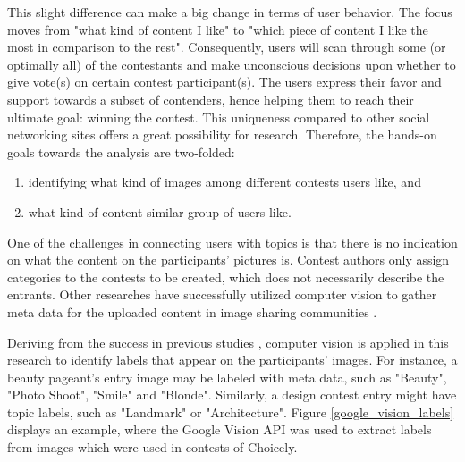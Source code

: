     This slight difference can make a big change in terms of user behavior. The focus moves from "what kind of content I like" to "which piece of content I like the most in comparison to the rest". Consequently, users will scan through some (or optimally all) of the contestants and make unconscious decisions upon whether to give vote(s) on certain contest participant(s). The users express their favor and support towards a subset of contenders, hence helping them to reach their ultimate goal: winning the contest. 
    This uniqueness compared to other social networking sites offers a great possibility for research. Therefore, the hands-on goals towards the analysis are two-folded: 

    \begin{enumerate}
        \item identifying what kind of images among different contests users like, and
        \item what kind of content similar group of users like.
    \end{enumerate}

    One of the challenges in connecting users with topics is that there is no indication on what the content on the participants' pictures is. Contest authors only assign categories to the contests to be created, which does not necessarily describe the entrants. Other researches have successfully utilized computer vision to gather meta data for the uploaded content in image sharing communities \cite{bakhshi2014faces, hu2014we}. 
    
    Deriving from the success in previous studies \cite{hu2014we, farseev2015harvestingmultiplesources, han2016teensarefrommars, bakhshi2014faces}, computer vision is applied in this research to identify labels that appear on the participants' images. For instance, a beauty pageant's entry image may be labeled with meta data, such as "Beauty", "Photo Shoot", "Smile" and "Blonde". Similarly, a design contest entry might have topic labels, such as "Landmark" or "Architecture". Figure \ref{google_vision_labels} displays an example, where the Google Vision API was used to extract labels from images which were used in contests of Choicely.

